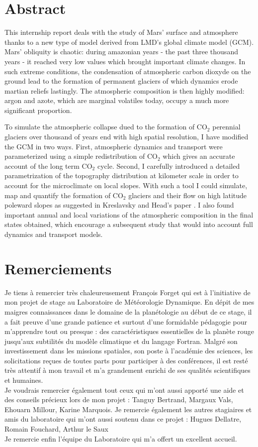 \documentclass[11pt,a4paper]{article}
\begin{document}
\section*{Abstract}
This internship report deals with the study of Mars' surface and atmosphere thanks to a new type of model derived from LMD's global climate model (GCM). Mars' obliquity is chaotic: during amazonian years - the past three thousand years - it reached very low values which brought important climate changes. In such extreme conditions, the condensation of atmospheric carbon dioxyde on the ground lead to the formation of permanent glaciers of which dynamics erode martian reliefs lastingly. The atmospheric composition is then highly modified: argon and azote, which are marginal volatiles today, occupy a much more significant proportion.

To simulate the atmospheric collapse dued to the formation of CO$_2$ perennial  glaciers over thousand of years end with high spatial resolution, I have modified the GCM in two ways. First, atmospheric dynamics and transport were parameterized using a simple redistribution of CO$_2$ which gives an accurate account of the long term CO$_2$ cycle. Second, I carefully introduced a detailed parametrization of the topography distribution at kilometer scale in order to account for the microclimate on local slopes. With such a tool I could simulate, map and quantify the formation of CO$_2$ glaciers and their flow on high latitude poleward slopes as suggested in Kreslavsky and Head's paper \cite{Kres:05}. I also found important annual and local variations of the atmospheric composition in the final states obtained, which encourage a subsequent study that would into account full dynamics and transport models.

\clearpage
\section*{Remerciements}
Je tiens à remercier très chaleureusement François Forget qui est à l'initiative de mon projet de stage au Laboratoire de Météorologie Dynamique. En dépit de mes maigres connaissances dans le domaine de la planétologie au début de ce stage, il a fait preuve d'une grande patience et surtout d'une formidable pédagogie pour m'apprendre tout ou presque : des caractéristiques essentielles de la planète rouge jusqu'aux subtilités du modèle climatique et du langage Fortran. Malgré son investissement dans les missions spatiales, son poste à l'académie des sciences, les solicitations reçues de toutes parts pour participer à des conférences, il est resté très attentif à mon travail et m'a grandement enrichi de ses qualités scientifiques et humaines.\\
Je voudrais remercier également tout ceux qui m'ont aussi apporté une aide et des conseils précieux  lors de mon projet : Tanguy Bertrand, Margaux Vals, Ehouarn Millour, Karine Marquois. Je remercie également les autres stagiaires et amis du laboratoire qui m'ont aussi soutenu dans ce projet : Hugues Dellatre, Romain Fouchard, Arthur le Saux \\
Je remercie enfin l'équipe du Laboratoire qui m'a offert un excellent accueil.
\end{document}
